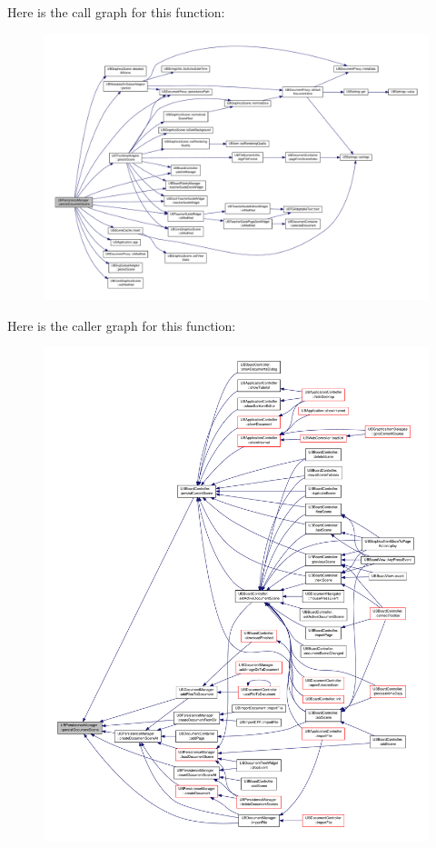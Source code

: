 Here is the call graph for this function\-:
\nopagebreak
\begin{figure}[H]
\begin{center}
\leavevmode
\includegraphics[width=350pt]{d0/dd5/class_u_b_persistence_manager_abc6ab5e964275e015e5da1450c2b8675_cgraph}
\end{center}
\end{figure}




Here is the caller graph for this function\-:
\nopagebreak
\begin{figure}[H]
\begin{center}
\leavevmode
\includegraphics[width=350pt]{d0/dd5/class_u_b_persistence_manager_abc6ab5e964275e015e5da1450c2b8675_icgraph}
\end{center}
\end{figure}


